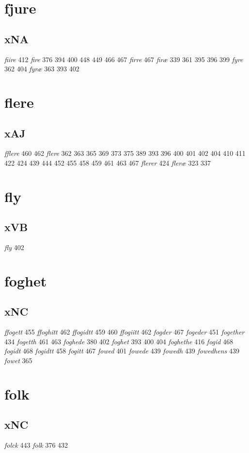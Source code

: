 \documentclass[a4paper,twocolumn]{article}
\begin{document}
\section{fjure}
\label{sec:orga9c3896}
\subsection{xNA}
\label{sec:org491593c}
\emph{fiire} 412 \emph{fire} 376 394 400 448 449 466 467 \emph{firre} 467 \emph{firæ} 339 361 395 396 399 \emph{fyre} 362 404 \emph{fyræ} 363 393 402 
\section{flere}
\label{sec:orgcc09c6d}
\subsection{xAJ}
\label{sec:org4499816}
\emph{fflere} 460 462 \emph{flere} 362 363 365 369 373 375 389 393 396 400 401 402 404 410 411 422 424 439 444 452 455 458 459 461 463 467 \emph{flerer} 424 \emph{fleræ} 323 337 
\section{fly}
\label{sec:org63c95e4}
\subsection{xVB}
\label{sec:orgce4113e}
\emph{fly} 402 
\section{foghet}
\label{sec:org1509e7d}
\subsection{xNC}
\label{sec:org4d58149}
\emph{ffogett} 455 \emph{ffoghitt} 462 \emph{ffogidtt} 459 460 \emph{ffogiitt} 462 \emph{fogder} 467 \emph{fogeder} 451 \emph{fogether} 434 \emph{fogetth} 461 463 \emph{foghede} 380 402 \emph{foghet} 393 400 404 \emph{foghethe} 416 \emph{fogid} 468 \emph{fogidt} 468 \emph{fogidtt} 458 \emph{fogitt} 467 \emph{fowed} 401 \emph{fowede} 439 \emph{fowedh} 439 \emph{fowedhens} 439 \emph{fowet} 365 
\section{folk}
\label{sec:orgb1f76cb}
\subsection{xNC}
\label{sec:orgde3778b}
\emph{folck} 443 \emph{folk} 376 432 
\end{document}
